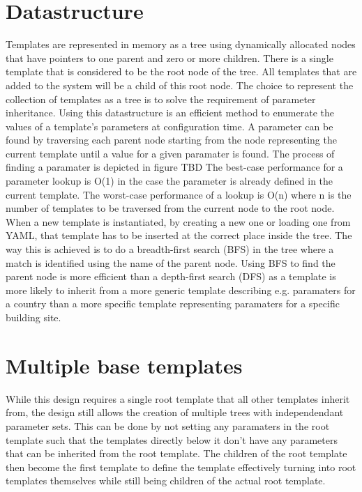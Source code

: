 \section{Datastructure}
Templates are represented in memory as a tree using dynamically allocated nodes that have pointers to one parent and zero or more children.
There is a single template that is considered to be the root node of the tree.
All templates that are added to the system will be a child of this root node.
The choice to represent the collection of templates as a tree is to solve the requirement of parameter inheritance.
Using this datastructure is an efficient method to enumerate the values of a template's parameters at configuration time.
A parameter can be found by traversing each parent node starting from the node representing the current template until a value for a given paramater is found.
The process of finding a paramater is depicted in figure TBD %
The best-case performance for a parameter lookup is O(1) in the case the parameter is already defined in the current template.
The worst-case performance of a lookup is O(n) where n is the number of templates to be traversed from the current node to the root node.
When a new template is instantiated, by creating a new one or loading one from YAML, that template has to be inserted at the correct place inside the tree.
The way this is achieved is to do a breadth-first search (BFS) in the tree where a match is identified using the name of the parent node.
Using BFS to find the parent node is more efficient than a depth-first search (DFS) as a template is more likely to inherit from a more generic template describing e.g. paramaters for a country than a more specific template representing paramaters for a specific building site. %

\section{Multiple base templates} %
While this design requires a single root template that all other templates inherit from, the design still allows the creation of multiple trees with independendant parameter sets.
This can be done by not setting any paramaters in the root template such that the templates directly below it don't have any parameters that can be inherited from the root template.
The children of the root template then become the first template to define the template effectively turning into root templates themselves while still being children of the actual root template.

